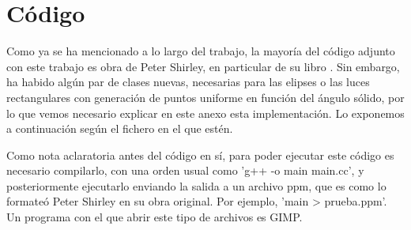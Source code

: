 \documentclass{scrbook}
\begin{document}
\appendix
\chapter{Código}
\label{anexo}
Como ya se ha mencionado a lo largo del trabajo, la mayoría del código adjunto con este trabajo es obra de Peter Shirley, en particular de su libro \cite{RestOfYourLife}. Sin embargo, ha habido algún par de clases nuevas, necesarias para las elipses o las luces rectangulares con generación de puntos uniforme en función del ángulo sólido, por lo que vemos necesario explicar en este anexo esta implementación. Lo exponemos a continuación según el fichero en el que estén.

Como nota aclaratoria antes del código en sí, para poder ejecutar este código es necesario compilarlo, con una orden usual como 'g++ -o main main.cc', y posteriormente ejecutarlo enviando la salida a un archivo ppm, que es como lo formateó Peter Shirley en su obra original. Por ejemplo, 'main > prueba.ppm'. Un programa con el que abrir este tipo de archivos es GIMP.

\lstset{language=C++}

\end{document}
